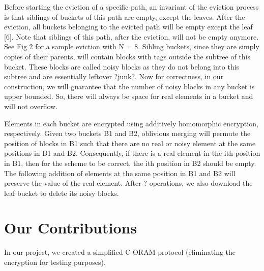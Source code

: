 \documentclass[12pt, oneside]{amsart}   	%
\begin{document}
Before starting the eviction of a specific path, an invariant of the eviction process is that siblings of buckets of this path are empty, except the leaves. After the eviction, all buckets belonging to the evicted path will be empty except the leaf [6]. Note that siblings of this path, after the eviction, will not be empty anymore. See Fig 2 for a sample eviction with N = 8.
Sibling buckets, since they are simply copies of their parents, will contain blocks with tags outside the subtree of this bucket. These blocks are called noisy blocks as they do not belong into this subtree and are essentially leftover ?junk?. Now for correctness, in our construction, we will guarantee that the number of noisy blocks in any bucket is upper bounded. So, there will always be space for real elements in a bucket and will not overflow.

Elements in each bucket are encrypted using additively homomorphic encryption, respectively. Given two buckets B1 and B2, oblivious merging will permute the position of blocks in B1 such that there are no real or noisy element at the same positions in B1 and B2. Consequently, if there is a real element in the ith position in B1, then for the scheme to be correct, the ith position in B2 should be empty. The following addition of elements at the same position in B1 and B2 will preserve the value of the real element. After ? operations, we also download the leaf bucket to delete its noisy blocks.

\section{Our Contributions}

In our project, we created a simplified C-ORAM protocol (eliminating the encryption for testing purposes). 
\end{document}
